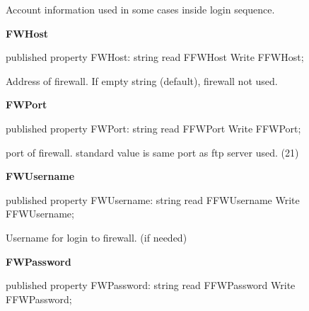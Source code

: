 \documentclass{report}
\newif\ifpdf
\begin{document}
\begin{list}{}
\begin{flushleft}
\ifpdf
\end{flushleft}
\fi


\par Account information used in some cases inside login sequence.\label{ftpsend.TFTPSend-FWHost}
\item[\textbf{FWHost}\hfill]
\ifpdf
\begin{flushleft}
\fi
\begin{ttfamily}
published property FWHost: string read FFWHost Write FFWHost;\end{ttfamily}

\ifpdf
\end{flushleft}
\fi


\par Address of firewall. If empty string (default), firewall not used.\label{ftpsend.TFTPSend-FWPort}
\item[\textbf{FWPort}\hfill]
\ifpdf
\begin{flushleft}
\fi
\begin{ttfamily}
published property FWPort: string read FFWPort Write FFWPort;\end{ttfamily}

\ifpdf
\end{flushleft}
\fi


\par port of firewall. standard value is same port as ftp server used. (21)\label{ftpsend.TFTPSend-FWUsername}
\item[\textbf{FWUsername}\hfill]
\ifpdf
\begin{flushleft}
\fi
\begin{ttfamily}
published property FWUsername: string read FFWUsername Write FFWUsername;\end{ttfamily}

\ifpdf
\end{flushleft}
\fi


\par Username for login to firewall. (if needed)\label{ftpsend.TFTPSend-FWPassword}
\item[\textbf{FWPassword}\hfill]
\ifpdf
\begin{flushleft}
\fi
\begin{ttfamily}
published property FWPassword: string read FFWPassword Write FFWPassword;\end{ttfamily}

\ifpdf
\end{flushleft}
\fi



\end{list}
\end{document}
